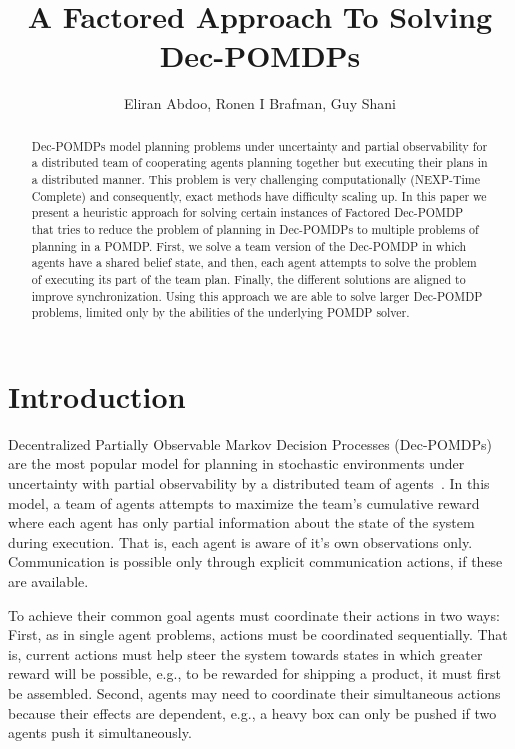 \documentclass[letterpaper]{article} %
\title{A Factored Approach To Solving Dec-POMDPs }
\author{Eliran Abdoo, Ronen I Brafman, Guy Shani}
\begin{document}
\maketitle

\begin{abstract}
Dec-POMDPs model planning problems under uncertainty and partial observability for a distributed team of cooperating agents planning together but executing their plans in a distributed manner. This problem is
very challenging computationally (NEXP-Time Complete) and consequently, exact methods have difficulty scaling up. In this paper
we present a heuristic approach for solving certain instances of Factored Dec-POMDP that tries to reduce the problem of planning in Dec-POMDPs to multiple
problems of planning in a POMDP. First, we solve a team version of the Dec-POMDP in which agents have a shared belief state, and then, each agent attempts to solve the problem of executing its part of the team plan. Finally, the different solutions are aligned to improve synchronization. Using this approach we are able to solve larger Dec-POMDP problems, limited only by the abilities of the underlying POMDP solver.
\end{abstract}




\section{Introduction}

Decentralized Partially Observable Markov Decision Processes (Dec-POMDPs) are the most popular model for planning in stochastic environments under uncertainty with partial observability by a distributed team of agents~\cite{}. In this model, a team of agents attempts to maximize the team's cumulative reward where each agent has only partial information about the state of the system during execution. That is, each agent is aware of it's own observations only. Communication is possible only through explicit communication actions, if these are available.  

To achieve their common goal agents must coordinate their actions in two ways: First, as in single agent problems, actions must be coordinated sequentially. That is, current actions must help steer the system towards states in which greater reward will be possible,
e.g., to be rewarded for shipping a product, it must first be assembled. 
Second, agents may need to coordinate their simultaneous actions because their effects are dependent, e.g., a heavy box can only be pushed if two agents push it simultaneously. 
\end{document}
